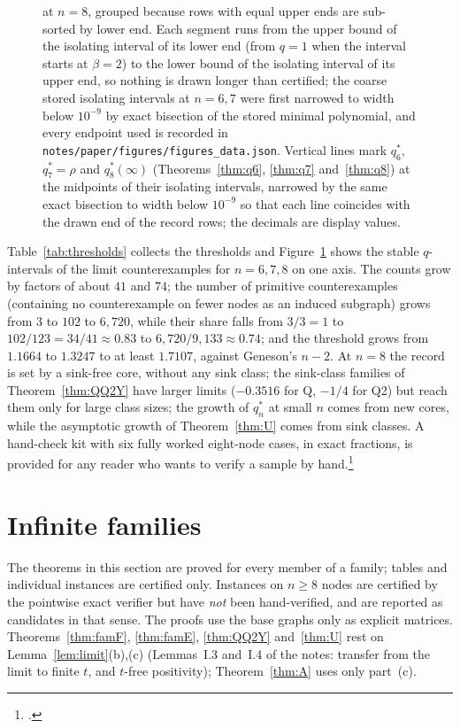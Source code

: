 \documentclass[11pt]{article}
\theoremstyle{definition}
\begin{document}
{\begin{figure}[t]
{at $n=8$, grouped because rows with equal upper ends are sub-sorted by lower end. Each segment runs from the upper bound
of the isolating interval of its lower end
(from $q=1$ when the interval starts at $\beta=2$) to the lower bound of the isolating interval of its upper end, so
nothing is drawn longer than certified; the coarse stored isolating intervals at $n=6,7$ were first narrowed to width
below $10^{-9}$ by exact bisection of the stored minimal polynomial, and every endpoint used is recorded in
\texttt{notes/paper/figures/figures\_data.json}. Vertical lines mark $q_6^*$, $q_7^*=\rho$ and $q_8^*(\infty)$
(Theorems~\ref{thm:q6}, \ref{thm:q7} and~\ref{thm:q8}) at the midpoints of their isolating intervals, narrowed by the
same exact bisection to width below $10^{-9}$ so that each line coincides with the drawn end of the record rows; the
decimals are display values.}\label{fig:thresholds}
\end{figure}
Table~\ref{tab:thresholds} collects the thresholds and Figure~\ref{fig:thresholds} shows the stable $q$-intervals of
the limit counterexamples for $n=6,7,8$ on one axis. The counts grow by factors of about $41$ and $74$; the number of
primitive counterexamples (containing no counterexample on fewer nodes as an induced subgraph) grows from $3$ to $102$ to
$6{,}720$, while their share falls from $3/3=1$ to $102/123=34/41\approx0.83$ to $6{,}720/9{,}133\approx0.74$; and the
threshold grows from $1.1664$ to $1.3247$ to at least $1.7107$, against Geneson's $n-2$. At $n=8$ the record is set by a
sink-free core, without any sink class; the sink-class families of Theorem~\ref{thm:QQ2Y} have larger limits ($-0.3516$ for
Q, $-1/4$ for Q2) but reach them only for large class sizes; the growth of $q_n^*$ at small $n$ comes from new cores, while the
asymptotic growth of Theorem~\ref{thm:U} comes from sink classes. A hand-check kit with six fully worked eight-node
cases, in exact fractions, is provided for any reader who wants to verify a sample by hand.\footnote{.}

\section{Infinite families}\label{sec:families}

The theorems in this section are proved for every member of a family; tables and individual instances are certified
only. Instances on $n\ge8$ nodes are certified by the pointwise exact verifier but have \emph{not} been hand-verified, and
are reported as candidates in that sense. The proofs use the base graphs only as explicit matrices. Theorems~\ref{thm:famF},
\ref{thm:famE}, \ref{thm:QQ2Y} and~\ref{thm:U} rest on Lemma~\ref{lem:limit}(b),(c) (Lemmas~I.3 and~I.4 of the notes:
transfer from the limit to finite $t$, and $t$-free positivity); Theorem~\ref{thm:A} uses only part~(c).

}
\end{document}
